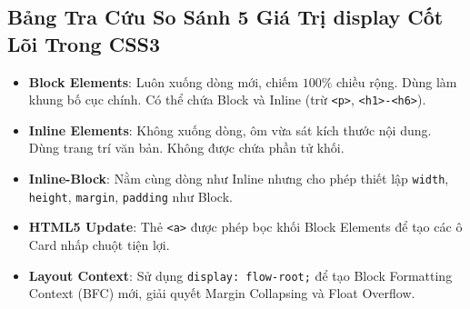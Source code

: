 \documentclass[11pt,oneside]{book}
\newcommand{\thd}[1]{\textcolor{white}{\textbf{\strut #1}}}
\newcommand{\codeinline}[1]{\textcolor{accentOrange}{\texttt{#1}}}
\begin{document}
\Needspace*{80pt}
\subsection{Bảng Tra Cứu So Sánh 5 Giá Trị display Cốt Lõi Trong CSS3}

\begin{prettyTableBox}
\end{prettyTableBox}

\begin{conceptBox}
\begin{itemize}[leftmargin=1.5em, itemsep=3pt, parsep=0pt]
    \item \textbf{Block Elements}: Luôn xuống dòng mới, chiếm $100\%$ chiều rộng. Dùng làm khung bố cục chính. Có thể chứa Block và Inline (trừ \codeinline{<p>}, \codeinline{<h1>-<h6>}).
    \item \textbf{Inline Elements}: Không xuống dòng, ôm vừa sát kích thước nội dung. Dùng trang trí văn bản. Không được chứa phần tử khối.
    \item \textbf{Inline-Block}: Nằm cùng dòng như Inline nhưng cho phép thiết lập \codeinline{width}, \codeinline{height}, \codeinline{margin}, \codeinline{padding} như Block.
    \item \textbf{HTML5 Update}: Thẻ \codeinline{<a>} được phép bọc khối Block Elements để tạo các ô Card nhấp chuột tiện lợi.
    \item \textbf{Layout Context}: Sử dụng \codeinline{display: flow-root;} để tạo Block Formatting Context (BFC) mới, giải quyết Margin Collapsing và Float Overflow.
\end{itemize}
\end{conceptBox}
\end{document}
